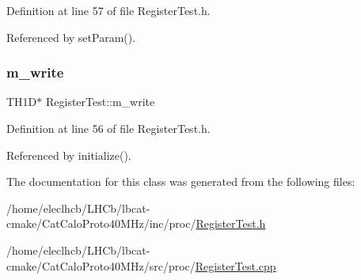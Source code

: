 Definition at line 57 of file Register\+Test.\+h.



Referenced by set\+Param().

\mbox{\label{classRegisterTest_a4e2dbc640871ece43a554425e2b73dcf}} 
\subsubsection{\texorpdfstring{m\+\_\+write}{m\_write}}
{\footnotesize\ttfamily T\+H1D$\ast$ Register\+Test\+::m\+\_\+write\hspace{0.3cm}{\ttfamily [private]}}



Definition at line 56 of file Register\+Test.\+h.



Referenced by initialize().



The documentation for this class was generated from the following files\+:\begin{DoxyCompactItemize}
\item 
/home/eleclhcb/\+L\+H\+Cb/lbcat-\/cmake/\+Cat\+Calo\+Proto40\+M\+Hz/inc/proc/\hyperlink{RegisterTest_8h}{Register\+Test.\+h}\item 
/home/eleclhcb/\+L\+H\+Cb/lbcat-\/cmake/\+Cat\+Calo\+Proto40\+M\+Hz/src/proc/\hyperlink{RegisterTest_8cpp}{Register\+Test.\+cpp}\end{DoxyCompactItemize}
